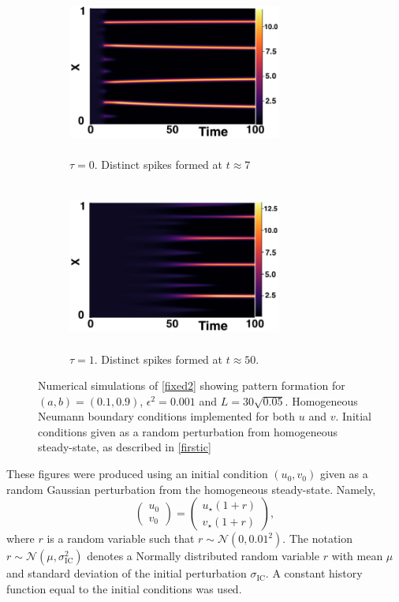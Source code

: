 \begin{figure}[H]
    \centering
    \begin{subfigure}[b]{0.45\textwidth}
        \centering
        \includegraphics[width=7cm,height = 5.5cm]{patt1.png}
        \caption{$\tau=0$. Distinct spikes formed at $t\approx7$ }
        \label{}
    \end{subfigure}
    \hfill
    \begin{subfigure}[b]{0.45\textwidth}
        \centering
        \includegraphics[width=7cm,height = 5.5cm]{patt2.png}
        \caption{$\tau=1$. Distinct spikes formed at $t\approx50$.}
        \label{}
    \end{subfigure}
    \caption{Numerical simulations of \eqref{fixed2} showing pattern formation for $(a,b)=(0.1,0.9)$, $\epsilon^2=0.001$ and $L=30\sqrt{0.05}$. Homogeneous Neumann boundary conditions implemented for both $u$ and $v$. Initial conditions given as a random perturbation from homogeneous steady-state, as described in \eqref{firstic}}
    \label{fig:fixedsim2}
\end{figure}
These figures were produced using an initial condition $(u_0,v_0)$ given as a random Gaussian perturbation from the homogeneous steady-state. Namely,
\begin{equation}\label{firstic}
\begin{pmatrix}u_0\\v_0\end{pmatrix}=\begin{pmatrix}u_\star(1+r)\\v_\star(1+r)\end{pmatrix},
\end{equation}
where $r$ is a random variable such that $r\sim\mathcal{N}\left(0,0.01^2\right)$. The notation $r\sim\mathcal{N}\left(\mu,\sigma_{\text{IC}}^2\right)$ denotes a Normally distributed random variable $r$ with mean $\mu$ and standard deviation of the initial perturbation $\sigma_{\text{IC}}$. A constant history function equal to the initial conditions was used.
